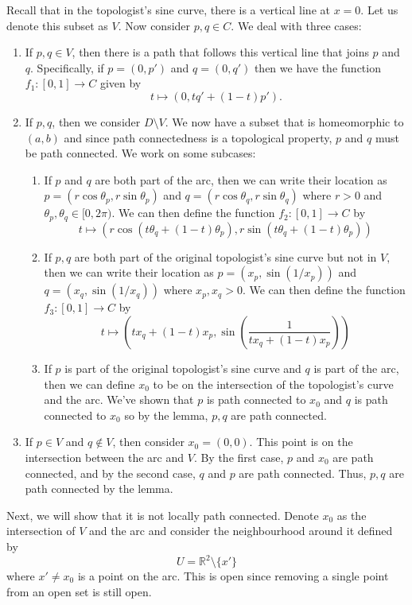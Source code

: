 \documentclass{article}
\numberwithin{equation}{section}
\begin{document}
\begin{enumerate}
    Recall that in the topologist's sine curve, there is a vertical line at $x=0.$ Let us denote this subset as $V.$ Now consider $p,q\in C.$ We deal with three cases:
    \begin{enumerate}[label=Case (\roman*)]
        \item If $p,q \in V$, then there is a path that follows this vertical line that joins $p$ and $q.$ Specifically, if $p=(0,p')$ and $q=(0,q')$ then we have the function $f_1:[0,1]\to C$ given by 
        $$t\mapsto (0,tq'+(1-t)p').$$ 
        \item If $p,q$, then we consider $D \setminus V.$ We now have a subset that is homeomorphic to $(a,b)$ and since path connectedness is a topological property, $p$ and $q$ must be path connected. We work on some subcases:
        \begin{enumerate}[label=(\alph*)]
            \item If $p$ and $q$ are both part of the arc, then we can write their location as $p=(r\cos\theta_p,r\sin\theta_p)$ and $q=(r\cos\theta_q,r\sin\theta_q)$ where $r>0$ and $\theta_p,\theta_q \in [0,2\pi).$ We can then define the function $f_2:[0,1]\to C$ by
            \begin{equation}
                t\mapsto (r\cos(t\theta_q+(1-t)\theta_p),r\sin(t\theta_q+(1-t)\theta_p))
            \end{equation}
            \item If $p,q$ are both part of the original topologist's sine curve but not in $V,$ then we can write their location as $p=(x_p,\sin(1/x_p))$ and $q=(x_q,\sin(1/x_q))$ where $x_p,x_q > 0.$ We can then define the function $f_3:[0,1]\to C$ by
            \begin{equation}
                t\mapsto \left(tx_q + (1-t)x_p,\sin(\frac{1}{tx_q + (1-t)x_p})\right)
            \end{equation}
            \item If $p$ is part of the original topologist's sine curve and $q$ is part of the arc, then we can define $x_0$ to be on the intersection of the topologist's curve and the arc. We've shown that $p$ is path connected to $x_0$ and $q$ is path connected to $x_0$ so by the lemma, $p,q$ are path connected.
        \end{enumerate}
        \item If $p\in V$ and $q\notin V$, then consider $x_0 = (0,0).$ This point is on the intersection between the arc and $V.$ By the first case, $p$ and $x_0$ are path connected, and by the second case, $q$ and $p$ are path connected. Thus, $p,q$ are path connected by the lemma.
    \end{enumerate}
    Next, we will show that it is not locally path connected. Denote $x_0$ as the intersection of $V$ and the arc and consider the neighbourhood around it defined by 
    \begin{equation}
        U = \mathbb{R}^2 \setminus \{x'\}
    \end{equation}
    where $x' \neq x_0$ is a point on the arc. This is open since removing a single point from an open set is still open. 
    

\end{enumerate}
\end{document}
